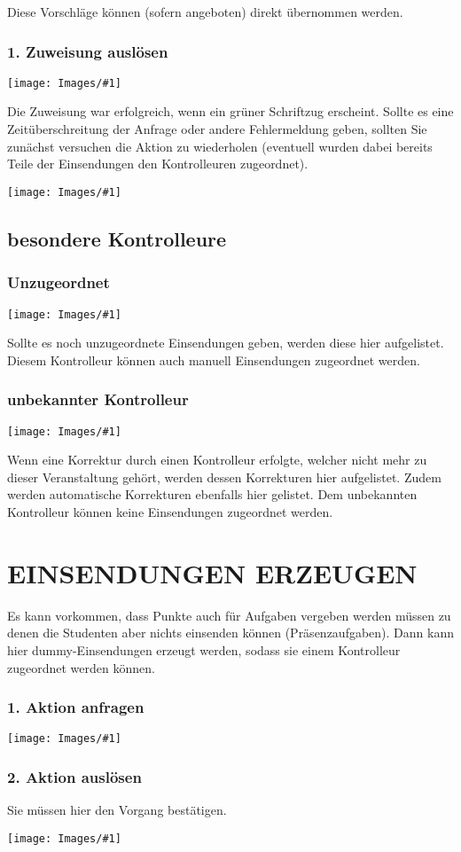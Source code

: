 \documentclass[a4paper,final]{scrartcl}
\numberwithin{equation}{section}
\newenvironment{Bilder}
  {\par\raggedbottom\null\noindent\minipage{\textwidth}\centering}
  {\endminipage\vspace{0.7cm}}
\newcommand{\tbild}[1]{%
\begin{Bilder}
 \texttt{[image: Images/\#1]}
	\end{Bilder}
}
\begin{document}
Diese Vorschläge können (sofern angeboten) direkt übernommen werden.

\newpage
\subsubsection*{1. Zuweisung auslösen}
\tbild{manG.png}

Die Zuweisung war erfolgreich, wenn ein grüner Schriftzug erscheint. Sollte es eine Zeitüberschreitung der Anfrage oder andere Fehlermeldung geben, sollten Sie zunächst versuchen die Aktion zu wiederholen (eventuell wurden dabei bereits Teile der Einsendungen den Kontrolleuren zugeordnet).
\tbild{manC.png}

\subsection{besondere Kontrolleure}
\subsubsection*{Unzugeordnet}
\tbild{manD}
Sollte es noch unzugeordnete Einsendungen geben, werden diese hier aufgelistet. Diesem Kontrolleur können auch manuell Einsendungen zugeordnet werden.

\newpage
\subsubsection*{unbekannter Kontrolleur}
\tbild{manE}
Wenn eine Korrektur durch einen Kontrolleur erfolgte, welcher nicht mehr zu dieser Veranstaltung gehört, werden dessen Korrekturen hier aufgelistet. Zudem werden automatische Korrekturen ebenfalls hier gelistet. Dem unbekannten Kontrolleur können keine Einsendungen zugeordnet werden.

\newpage
\section{EINSENDUNGEN ERZEUGEN}
Es kann vorkommen, dass Punkte auch für Aufgaben vergeben werden müssen zu denen die Studenten aber nichts einsenden können (Präsenzaufgaben). Dann kann hier dummy-Einsendungen erzeugt werden, sodass sie einem Kontrolleur zugeordnet werden können.
\subsubsection*{1. Aktion anfragen}
\tbild{makeA.png}

\subsubsection*{2. Aktion auslösen}
Sie müssen hier den Vorgang bestätigen.
\tbild{makeB.png}
\end{document}
